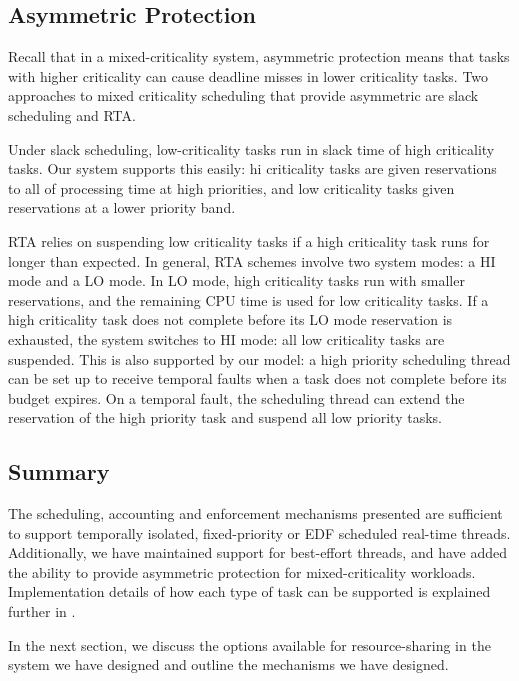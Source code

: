 \subsection{Asymmetric Protection}

Recall that in a mixed-criticality system, asymmetric protection means that tasks with higher criticality can cause deadline misses in lower criticality tasks.
Two approaches to mixed criticality scheduling that provide asymmetric are slack scheduling and
\gls{RTA}\citet{Burns_Davis_14}.

Under slack scheduling, low-criticality tasks run in slack time of high criticality tasks.
Our system supports this easily: hi criticality tasks are given reservations to all of processing time at high priorities, and low criticality tasks given reservations at a lower priority band.

\gls{RTA} relies on suspending low criticality tasks if a high criticality task runs for longer than expected.
In general, \gls{RTA} schemes involve two system modes: a HI mode and a LO mode.
In LO mode, high criticality tasks run with smaller reservations, and the remaining CPU time is used for low criticality tasks.
If a high criticality task does not complete before its LO mode reservation is exhausted, the system switches to HI mode: all low criticality tasks are suspended.
This is also supported by our model: a high priority scheduling thread can be set up to receive temporal faults when a task does not complete before its budget expires.
On a temporal fault, the scheduling thread can extend the reservation of the high priority task and suspend all low priority tasks.

\subsection{Summary}

The scheduling, accounting and enforcement mechanisms presented are sufficient to support temporally isolated, fixed-priority or \gls{EDF} scheduled real-time threads.
Additionally, we have maintained support for best-effort threads, and have added the ability to provide asymmetric protection for mixed-criticality workloads.
Implementation details of how each type of task can be supported is explained further in .

In the next section, we discuss the options available for resource-sharing in the system we have designed and outline the mechanisms we have designed.


